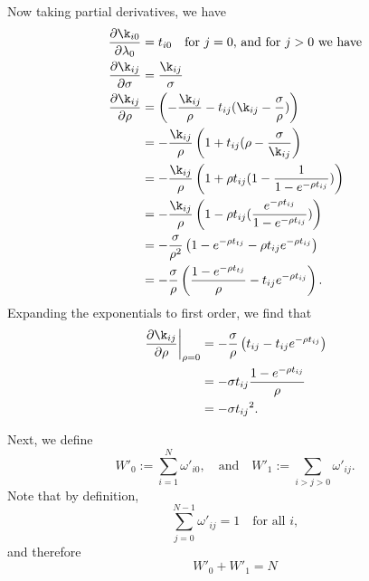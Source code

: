 \documentclass[12pt,leqno]{article}
\begin{document}
Now taking partial derivatives, we have
\begin{equation}\label{dk_dparams}
  \begin{split}
    \frac{\partial\k_{i0}}{\partial\lambda_0} &= 
        t_{i0} \quad\text{for $j = 0$, and for $j > 0$ we have}\\
    \frac{\partial\k_{ij}}{\partial\sigma} &= 
      \frac{\k_{ij}}{\sigma}\\
    \frac{\partial\k_{ij}}{\partial\rho} &=
    \left(-\frac{\k_{ij}}{\rho} -t_{ij}(\k_{ij} - \frac{\sigma}{\rho})\right)\\
    &= -\frac{\k_{ij}}{\rho}\left(1 + t_{ij}(\rho-\frac{\sigma}{\k_{ij}}\right) \\
    &= -\frac{\k_{ij}}{\rho}\left(1 + \rho{t_{ij}}(1-\frac{1}{1-e^{-\rho{t_{ij}}}})\right)\\
    &= -\frac{\k_{ij}}{\rho}\left(1 - \rho{t_{ij}}(\frac{e^{-\rho{t_{ij}}}}{1-e^{-\rho{t_{ij}}}})\right)\\
    &= -\frac{\sigma}{\rho^2}\left(1-e^{-\rho{t_{tj}}} - \rho{t_{ij}}e^{-\rho{t_{ij}}}\right)\\
    &= -\frac{\sigma}{\rho}\left(\frac{1-e^{-\rho{t_{tj}}}}{\rho} - t_{ij}e^{-\rho{t_{ij}}}\right).
  \end{split}
\end{equation}
Expanding the exponentials to first order, we find that
\begin{equation}\label{dk_drho(0)}
  \begin{split}
    \left.\frac{\partial\k_{ij}}{\partial\rho}\right|_{\rho=0} &=
    -\frac{\sigma}{\rho}\left(t_{ij} - t_{ij}e^{-\rho{t_{ij}}}\right)\\
      &= -\sigma t_{ij}\frac{1-e^{-\rho t_{ij}}}{\rho}\\
      &= -\sigma{t_{ij}}^2.
\end{split}
\end{equation}

Next, we define
$$
W'_0 := \sum_{i=1}^N\omega'_{i0},\quad\text{and}\quad   W'_1 := \sum_{i>j>0}\omega'_{ij}.
$$
Note that by definition,
$$
\sum_{j=0}^{N-1}\omega'_{ij} = 1\quad\text{for all } i,
$$
and therefore
\begin{equation}\label{W0+W1}
  W'_0 + W'_1 = N
\end{equation}
\end{document}
